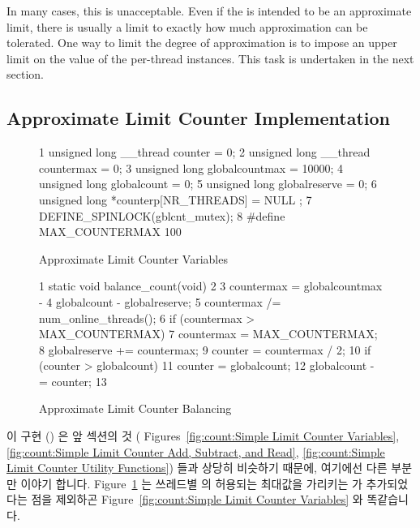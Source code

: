 In many cases, this is unacceptable.
Even if the  is intended to be an approximate limit,
there is usually a limit to exactly how much approximation can be tolerated.
One way to limit the degree of approximation is to impose an upper limit
on the value of the per-thread  instances.
This task is undertaken in the next section.
\fi

\subsection{Approximate Limit Counter Implementation}
\label{sec:count:Approximate Limit Counter Implementation}

\begin{figure}[tbp]
{ \scriptsize
\begin{verbbox}
  1 unsigned long __thread counter = 0;
  2 unsigned long __thread countermax = 0;
  3 unsigned long globalcountmax = 10000;
  4 unsigned long globalcount = 0;
  5 unsigned long globalreserve = 0;
  6 unsigned long *counterp[NR_THREADS] = { NULL };
  7 DEFINE_SPINLOCK(gblcnt_mutex);
  8 #define MAX_COUNTERMAX 100
\end{verbbox}
}
\centering
\theverbbox
\caption{Approximate Limit Counter Variables}
\label{fig:count:Approximate Limit Counter Variables}
\end{figure}

\begin{figure}[tbp]
{ \scriptsize
\begin{verbbox}
  1 static void balance_count(void)
  2 {
  3   countermax = globalcountmax -
  4                globalcount - globalreserve;
  5   countermax /= num_online_threads();
  6   if (countermax > MAX_COUNTERMAX)
  7     countermax = MAX_COUNTERMAX;
  8   globalreserve += countermax;
  9   counter = countermax / 2;
 10   if (counter > globalcount)
 11     counter = globalcount;
 12   globalcount -= counter;
 13 }
\end{verbbox}
}
\centering
\theverbbox
\caption{Approximate Limit Counter Balancing}
\label{fig:count:Approximate Limit Counter Balancing}
\end{figure}

이 구현 () 은 앞 섹션의 것 (
Figures~\ref{fig:count:Simple Limit Counter Variables},
\ref{fig:count:Simple Limit Counter Add, Subtract, and Read},
\ref{fig:count:Simple Limit Counter Utility Functions}) 들과 상당히 비슷하기
때문에, 여기에선 다른 부분만 이야기 합니다.
Figure~\ref{fig:count:Approximate Limit Counter Variables} 는 쓰레드별
 의 허용되는 최대값을 가리키는  가
추가되었다는 점을 제외하곤
Figure~\ref{fig:count:Simple Limit Counter Variables} 와 똑같습니다.

